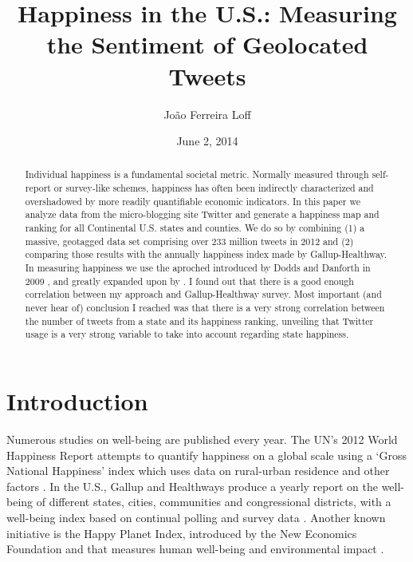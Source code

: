 \documentclass{llncs}
\begin{document}
\title{Happiness in the U.S.: Measuring the Sentiment of Geolocated Tweets}

\author{João Ferreira Loff \newline {}}
\date{June 2, 2014}

\maketitle

\begin{abstract}
Individual happiness is a fundamental societal metric. Normally measured through self-report or survey-like schemes, happiness has often been indirectly characterized and overshadowed by more readily quantifiable economic indicators. In this paper we analyze data from the micro-blogging site Twitter and generate a happiness map and ranking for all Continental U.S. states and counties. We do so by combining (1) a massive, geotagged data set comprising over 233 million tweets in 2012 and (2) comparing those results with the annually happiness index made by Gallup-Healthway. In measuring happiness we use the aproched introduced by Dodds and Danforth in 2009 \cite{Dodds2009}, and greatly expanded upon by \cite{Dodds2011,Mitchell2013}. I found out that there is a good enough correlation between my approach and Gallup-Healthway survey. Most important (and never hear of) conclusion I reached was that there is a very strong correlation between the number of tweets from a state and its happiness ranking, unveiling that Twitter usage is a very strong variable to take into account regarding state happiness.
\end{abstract}


\section{Introduction}

Numerous studies on well-being are published every year. The UN’s 2012 World Happiness Report attempts to quantify happiness on a global scale using a `Gross National Happiness' index which uses data on rural-urban residence and other factors \cite{Layard2013}. In the U.S., Gallup and Healthways produce a yearly report on the well-being of different states, cities, communities and congressional districts, with a well-being index based on continual polling and survey data \cite{GallupHealthway2013}. Another known initiative is the Happy Planet Index, introduced by the New Economics Foundation and that measures human well-being and environmental impact \cite{TheNewEconomicsFoundation2012}.
\end{document}
